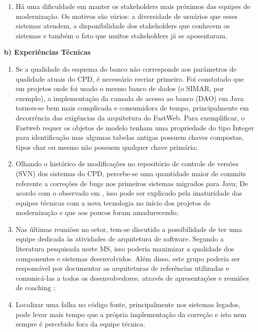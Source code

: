 \begin{enumerate}
\item
Há uma dificuldade em manter os stakeholders mais próximos das equipes de modernização. Os motivos são vários: a diversidade de usuários que esses sistemas atendem, a disponibilidade dos stakeholders que conhecem os sistemas e também o fato que muitos stakeholders já se aposentaram.


\end{enumerate}

\vspace{0.2cm} 

\textbf{b) Experiências Técnicas}

\vspace{0.2cm} 

\begin{enumerate}

\item
Se a qualidade do esquema do banco não corresponde aos parâmetros de qualidade atuais do CPD, é necessário recriar primeiro. Foi constatado que em projetos onde foi usado o mesmo banco de dados (o SIMAR, por exemplo), a implementação da camada de acesso ao banco (DAO) em Java tornou-se bem mais complicada e consumidora de tempo, principalmente em decorrência das exigências da arquitetura do FastWeb. Para exemplificar, o Fastweb requer os objetos de modelo tenham uma propriedade do tipo Integer para identificação mas algumas tabelas antigas possuem chaves compostas, tipos char ou mesmo não possuem qualquer chave primária;

\item
Olhando o histórico de modificações no repositório de controle de versões (SVN) dos sistemas do CPD, percebe-se uma quantidade maior de commits referente a correções de bugs nos primeiros sistemas migrados para Java; De acordo com o observado em \cite{S3_Bisbal:1999}, isso pode ser explicado pela imaturidade das equipes técnicas com a nova tecnologia no início dos projetos de modernização e que aos poucos foram amadurecendo;


\item
Nas últimas reuniões no setor, tem-se discutido a possibilidade de ter uma equipe dedicada às atividades de arquitetura de software. Segundo a literatura pesquisada neste MS, isso poderia maximizar a qualidade dos componentes e sistemas desenvolvidos. Além disso, este grupo poderia ser responsável por documentar as arquiteturas de referências utilizadas e comunicá-las a todos os desenvolvedores, através de apresentações e reuniões de coaching \cite{merson2013ultimate};

\item
Localizar uma falha no código fonte, principalmente nos sistemas legados, pode levar mais tempo que a própria implementação da correção e isto nem sempre é percebido fora da equipe técnica.


\end{enumerate}


